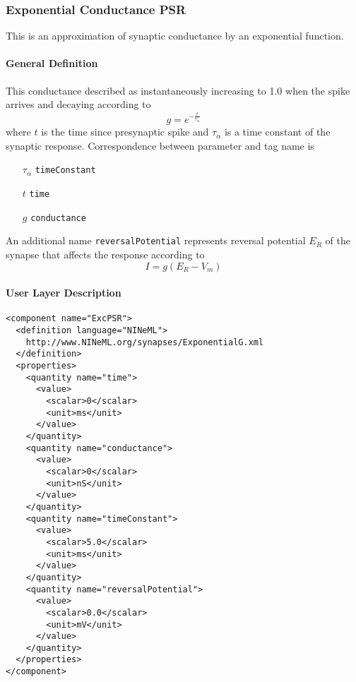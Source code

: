 \documentclass{article}
\begin{document}
\subsubsection{Exponential Conductance PSR}

This is an approximation of synaptic conductance by an exponential function.

\paragraph{General Definition}
This conductance described as instantaneously increasing to 1.0 when the spike
arrives and decaying according to
\begin{equation}
g=e^{-\frac{t}{\tau_{\alpha}}}
\label{expC}
\end{equation}
where $t$ is the time since presynaptic spike and $\tau_{\alpha}$ is
a time constant of the synaptic response.
Correspondence between parameter and tag name is
\begin{itemize}
\item[$\tau_{\alpha}$] {\tt timeConstant}
\item[$t$] {\tt time}
\item[$g$] {\tt conductance}
\end{itemize}
An additional name {\tt reversalPotential} represents reversal potential $E_R$ of the
synapse that affects the response according to
\begin{equation}
I=g(E_R-V_m)
\label{expCurRev}
\end{equation}

\paragraph{User Layer Description}
\begin{verbatim}
<component name="ExcPSR">
  <definition language="NINeML">
    http://www.NINeML.org/synapses/ExponentialG.xml
  </definition>
  <properties>
    <quantity name="time">
      <value>
        <scalar>0</scalar>
        <unit>ms</unit>
      </value>
    </quantity>
    <quantity name="conductance">
      <value>
        <scalar>0</scalar>
        <unit>nS</unit>
      </value>
    </quantity>
    <quantity name="timeConstant">
      <value>
        <scalar>5.0</scalar>
        <unit>ms</unit>
      </value>
    </quantity>
    <quantity name="reversalPotential">
      <value>
        <scalar>0.0</scalar>
        <unit>mV</unit>
      </value>
    </quantity>
  </properties>
</component>
\end{verbatim}
\end{document}
